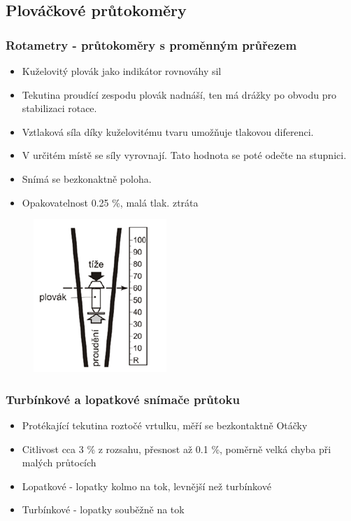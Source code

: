\subsection*{Plováčkové průtokoměry}

\subsubsection*{Rotametry - průtokoměry s proměnným průřezem}
\begin{itemize}
    \item Kuželovitý plovák jako indikátor rovnováhy sil
    \item Tekutina proudící zespodu plovák nadnáší, ten má drážky po obvodu pro stabilizaci rotace.
    \item Vztlaková síla díky kuželovitému tvaru umožňuje tlakovou diferenci.
    \item V určitém místě se síly vyrovnají. Tato hodnota se poté odečte na stupnici.
    \item Snímá se bezkonaktně poloha.
    \item Opakovatelnost 0.25 \%, malá tlak. ztráta
\end{itemize}

\begin{figure}[h]
    \centering
    \includegraphics[scale = 1]{img/rotatometr.png}
\end{figure}

\subsubsection*{Turbínkové a lopatkové snímače průtoku}
\begin{itemize}
    \item Protékající tekutina roztočé vrtulku, měří se bezkontaktně Otáčky
    \item Citlivost cca 3 \% z rozsahu, přesnost až 0.1 \%, poměrně velká chyba při malých průtocích
    \item Lopatkové - lopatky kolmo na tok, levnější než turbínkové
    \item Turbínkové - lopatky souběžně na tok
\end{itemize}

